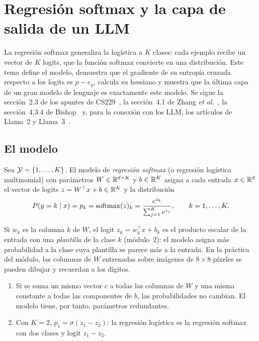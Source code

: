 \chapter{Regresión softmax y la capa de salida de un LLM}
\label{tema:4}

La regresión softmax generaliza la logística a $K$ clases: cada ejemplo recibe un vector de $K$ logits, que la función softmax convierte en una distribución. Este tema define el modelo, demuestra que el gradiente de su entropía cruzada respecto a los logits es $p-e_y$, calcula su hessiano y muestra que la última capa de un gran modelo de lenguaje es exactamente este modelo. Se sigue la sección~2.3 de los apuntes de CS229~\cite{cs229}, la sección~4.1 de Zhang \emph{et al.}~\cite{d2l}, la sección~4.3.4 de Bishop~\cite{bishop} y, para la conexión con los LLM, los artículos de Llama~2 y Llama~3~\cite{llama2,llama3}.

\section{El modelo}

\begin{definicion}\label{def:softmax-reg}
Sea $\mathcal{Y}=\{1,\dots,K\}$. El modelo de \emph{regresión softmax} (o regresión logística multinomial) con parámetros $W\in\mathbb{R}^{d\times K}$ y $b\in\mathbb{R}^{K}$ asigna a cada entrada $x\in\mathbb{R}^{d}$ el vector de logits $z=W^{\top}x+b\in\mathbb{R}^{K}$ y la distribución
\[
P(y=k\mid x)=p_k=\operatorname{softmax}(z)_k=\frac{e^{z_k}}{\sum_{j=1}^{K}e^{z_j}},\qquad k=1,\dots,K.
\]
\end{definicion}

Si $w_k$ es la columna $k$ de $W$, el logit $z_k=w_k^{\top}x+b_k$ es el producto escalar de la entrada con una \emph{plantilla} de la clase $k$ (módulo~2): el modelo asigna más probabilidad a la clase cuya plantilla se parece más a la entrada. En la práctica del módulo, las columnas de $W$ entrenadas sobre imágenes de $8\times 8$ píxeles se pueden dibujar y recuerdan a los dígitos.

\begin{proposicion}\label{prop:k2}
\begin{enumerate}
  \item Si se suma un mismo vector $c$ a todas las columnas de $W$ y una misma constante a todas las componentes de $b$, las probabilidades no cambian. El modelo tiene, por tanto, parámetros redundantes.
  \item Con $K=2$, $p_1=\sigma(z_1-z_2)$: la regresión logística es la regresión softmax con dos clases y logit $z_1-z_2$.
\end{enumerate}
\end{proposicion}

